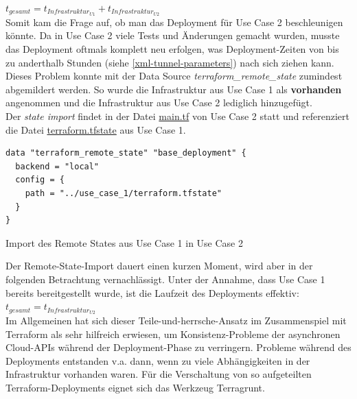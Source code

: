 $t_{gesamt} = t_{Infrastruktur_{U1}} + t_{Infrastruktur_{U2}}$\\

Somit kam die Frage auf, ob man das \gls{Deployment} für Use Case 2 beschleunigen könnte. Da in Use Case 2 viele Tests und Änderungen gemacht wurden, musste das \gls{Deployment} oftmals komplett neu erfolgen, was \gls{Deployment}-Zeiten von bis zu anderthalb Stunden (siehe \ref{xml-tunnel-parameters}) nach sich ziehen kann.\\
Dieses Problem konnte mit der Data Source \textit{terraform\_remote\_state} zumindest abgemildert werden\cite{remotestateimport2021}. So wurde die Infrastruktur aus Use Case 1 als \textbf{vorhanden} angenommen und die Infrastruktur aus Use Case 2 lediglich hinzugefügt.\\
Der \textit{state import} findet in der Datei \underline{main.tf} von Use Case 2 statt und referenziert die Datei \underline{terraform.tfstate} aus Use Case 1.
\begin{listing}[h]
\begin{verbatim}
data "terraform_remote_state" "base_deployment" {
  backend = "local"
  config = {
    path = "../use_case_1/terraform.tfstate"
  }
}

\end{verbatim}
\caption{Import des Remote States aus Use Case 1 in Use Case 2}
\label{tf-remote-state-import}
\end{listing}\FloatBarrier
Der Remote-State-Import dauert einen kurzen Moment, wird aber in der folgenden Betrachtung vernachlässigt.
Unter der Annahme, dass Use Case 1 bereits bereitgestellt wurde, ist die Laufzeit des \gls{Deployment}s effektiv:\\

$t_{gesamt} = t_{Infrastruktur_{U2}}$\\

Im Allgemeinen hat sich dieser \glqq Teile-und-herrsche\grqq{}-Ansatz im Zusammenspiel mit Terraform als sehr hilfreich erwiesen, um Konsistenz-Probleme der asynchronen Cloud-APIs während der \gls{Deployment}-Phase zu verringern\cite[S.183-184]{Brikman2019}. Probleme während des \gls{Deployment}s entstanden v.a. dann, wenn \glqq zu viele\grqq{} Abhängigkeiten in der Infrastruktur vorhanden waren. Für die Verschaltung von so aufgeteilten Terraform-\gls{Deployment}s eignet sich das Werkzeug Terragrunt\cite[S.98]{Brikman2019}.
\newpage
